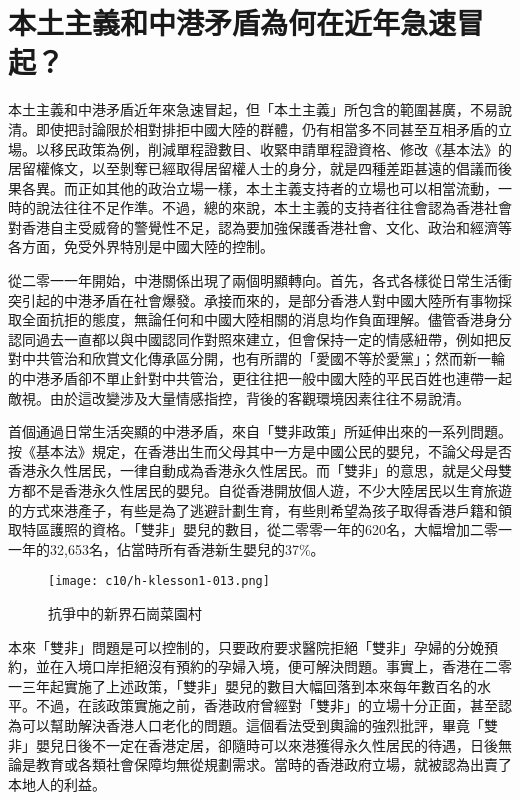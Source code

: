 \section{本土主義和中港矛盾為何在近年急速冒起？}

本土主義和中港矛盾近年來急速冒起，但「本土主義」所包含的範圍甚廣，不易說清。即使把討論限於相對排拒中國大陸的群體，仍有相當多不同甚至互相矛盾的立場。以移民政策為例，削減單程證數目、收緊申請單程證資格、修改《基本法》的居留權條文，以至剝奪已經取得居留權人士的身分，就是四種差距甚遠的倡議而後果各異。而正如其他的政治立場一樣，本土主義支持者的立場也可以相當流動，一時的說法往往不足作準。不過，總的來說，本土主義的支持者往往會認為香港社會對香港自主受威脅的警覺性不足，認為要加強保護香港社會、文化、政治和經濟等各方面，免受外界特別是中國大陸的控制。

從二零一一年開始，中港關係出現了兩個明顯轉向。首先，各式各樣從日常生活衝突引起的中港矛盾在社會爆發。承接而來的，是部分香港人對中國大陸所有事物採取全面抗拒的態度，無論任何和中國大陸相關的消息均作負面理解。儘管香港身分認同過去一直都以與中國認同作對照來建立，但會保持一定的情感紐帶，例如把反對中共管治和欣賞文化傳承區分開，也有所謂的「愛國不等於愛黨」；然而新一輪的中港矛盾卻不單止針對中共管治，更往往把一般中國大陸的平民百姓也連帶一起敵視。由於這改變涉及大量情感指控，背後的客觀環境因素往往不易說清。

首個通過日常生活突顯的中港矛盾，來自「雙非政策」所延伸出來的一系列問題。按《基本法》規定，在香港出生而父母其中一方是中國公民的嬰兒，不論父母是否香港永久性居民，一律自動成為香港永久性居民。而「雙非」的意思，就是父母雙方都不是香港永久性居民的嬰兒。自從香港開放個人遊，不少大陸居民以生育旅遊的方式來港產子，有些是為了逃避計劃生育，有些則希望為孩子取得香港戶籍和領取特區護照的資格。「雙非」嬰兒的數目，從二零零一年的620名，大幅增加二零一一年的32,653名，佔當時所有香港新生嬰兒的37\%。

\begin{figure}[htbp]
    \centering
    \texttt{[image: c10/h-klesson1-013.png]}
    \caption{抗爭中的新界石崗菜園村} 
\end{figure}

本來「雙非」問題是可以控制的，只要政府要求醫院拒絕「雙非」孕婦的分娩預約，並在入境口岸拒絕沒有預約的孕婦入境，便可解決問題。事實上，香港在二零一三年起實施了上述政策，「雙非」嬰兒的數目大幅回落到本來每年數百名的水平。不過，在該政策實施之前，香港政府曾經對「雙非」的立場十分正面，甚至認為可以幫助解決香港人口老化的問題。這個看法受到輿論的強烈批評，畢竟「雙非」嬰兒日後不一定在香港定居，卻隨時可以來港獲得永久性居民的待遇，日後無論是教育或各類社會保障均無從規劃需求。當時的香港政府立場，就被認為出賣了本地人的利益。

